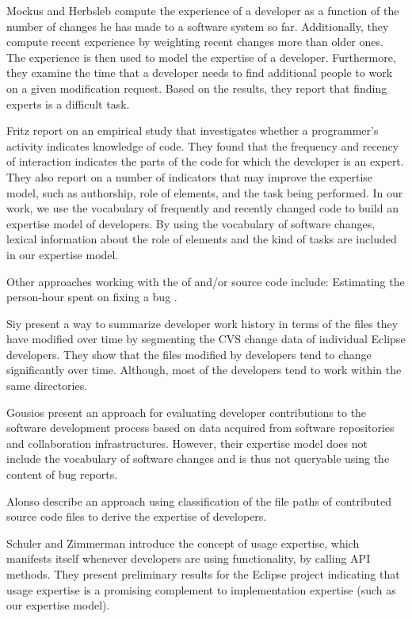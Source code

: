 Mockus and Herbsleb \cite{Mock02b} compute the experience of a developer as a function of the number of changes he has made to a software system so far. Additionally, they compute recent experience by weighting recent changes more than older ones. The experience is then used to model the expertise of a developer. Furthermore, they examine the time that a developer needs to find additional people to work on a given modification request. Based on the results, they report that finding experts is a difficult task.

Fritz \etal \cite{Frit07a} report on an empirical study that investigates whether a programmer's activity indicates knowledge of code. They found that the frequency and recency of interaction  indicates the parts of the code for which the developer is an expert. They also report on a number of indicators that may improve the expertise model, such as authorship, role of elements, and the task being performed. In our work, we use the vocabulary of frequently and recently changed code to build an expertise model of developers. By using the vocabulary of software changes, lexical information about the role of elements and the kind of tasks are included in our expertise model.

Other approaches working with the \VOC of \BRs and/or source code include: Estimating the person-hour spent on fixing a bug \cite{Weis07a}. 

Siy \etal \cite{Siy08a} present a way to summarize developer work history in terms of the files they have modified over time by segmenting the CVS change data of individual Eclipse developers. They show that the files modified by developers tend to change significantly over time. Although, most of the developers tend to work within the same directories. 


Gousios \etal \cite{Gous08a} present an approach for evaluating developer contributions to the software development process based on data acquired from software repositories and collaboration infrastructures. However, their expertise model does not include the vocabulary of software changes and is thus not queryable using the content of bug reports.

Alonso \etal \cite{Alon08a} describe an approach using classification of the file paths of contributed source code files to derive the expertise of developers. 

Schuler and Zimmerman \cite{Schu08a} introduce the concept of usage expertise, which manifests itself whenever developers are using functionality, \eg by calling API methods. They present preliminary
results for the Eclipse project indicating that usage expertise is a promising complement to implementation expertise (such as our expertise model). 

